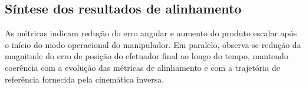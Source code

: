 \subsection{Síntese dos resultados de alinhamento}
\label{subsubsec_cap4_alinhamento_sintese}

As métricas indicam redução do erro angular e aumento do produto escalar após o início do modo operacional do manipulador.
Em paralelo, observa-se redução da magnitude do erro de posição do efetuador final ao longo do tempo, mantendo coerência com a evolução das métricas de alinhamento e com a trajetória de referência fornecida pela cinemática inversa.